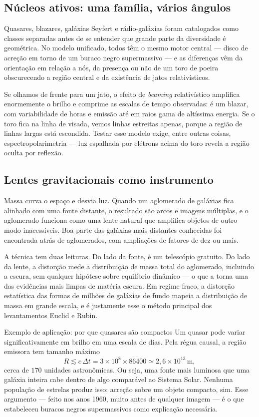 \documentclass[11pt,a4paper]{article}
\begin{document}
\subsection*{Núcleos ativos: uma família, vários ângulos}

Quasares, blazares, galáxias Seyfert e rádio-galáxias foram catalogados como classes separadas antes de se entender que grande parte da diversidade é geométrica. No modelo unificado, todos têm o mesmo motor central --- disco de acreção em torno de um buraco negro supermassivo --- e as diferenças vêm da orientação em relação a nós, da presença ou não de um toro de poeira obscurecendo a região central e da existência de jatos relativísticos.

Se olhamos de frente para um jato, o efeito de \textit{beaming} relativístico amplifica enormemente o brilho e comprime as escalas de tempo observadas: é um blazar, com variabilidade de horas e emissão até em raios gama de altíssima energia. Se o toro fica na linha de visada, vemos linhas estreitas apenas, porque a região de linhas largas está escondida. Testar esse modelo exige, entre outras coisas, espectropolarimetria --- luz espalhada por elétrons acima do toro revela a região oculta por reflexão.

\subsection*{Lentes gravitacionais como instrumento}

Massa curva o espaço e desvia luz. Quando um aglomerado de galáxias fica alinhado com uma fonte distante, o resultado são arcos e imagens múltiplas, e o aglomerado funciona como uma lente natural que amplifica objetos de outro modo inacessíveis. Boa parte das galáxias mais distantes conhecidas foi encontrada atrás de aglomerados, com ampliações de fatores de dez ou mais.

A técnica tem duas leituras. Do lado da fonte, é um telescópio gratuito. Do lado da lente, a distorção mede a distribuição de massa total do aglomerado, incluindo a escura, sem qualquer hipótese sobre equilíbrio dinâmico --- o que a torna uma das evidências mais limpas de matéria escura. Em regime fraco, a distorção estatística das formas de milhões de galáxias de fundo mapeia a distribuição de massa em grande escala, e é justamente esse o método principal dos levantamentos Euclid e Rubin.

\begin{lessonblock}{Exemplo de aplicação: por que quasares são compactos}
Um quasar pode variar significativamente em brilho em uma escala de dias. Pela régua causal, a região emissora tem tamanho máximo
\[
R\lesssim c\,\Delta t=3\times10^{8}\times86400\simeq2{,}6\times10^{13}\,\mathrm{m},
\]
cerca de $170$ unidades astronômicas. Ou seja, uma fonte mais luminosa que uma galáxia inteira cabe dentro de algo comparável ao Sistema Solar. Nenhuma população de estrelas produz isso; acreção sobre um objeto compacto, sim. Esse argumento --- feito nos anos 1960, muito antes de qualquer imagem --- é o que estabeleceu buracos negros supermassivos como explicação necessária.
\end{lessonblock}
\end{document}
